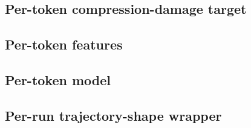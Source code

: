\documentclass[11pt,a4paper]{article}
\begin{document}
\subsection{Per-token compression-damage target}
\label{sec:herald:target}


\subsection{Per-token features}
\label{sec:herald:features}


\subsection{Per-token model}
\label{sec:herald:model}


\subsection{Per-run trajectory-shape wrapper}
\label{sec:herald:wrapper}

\end{document}

